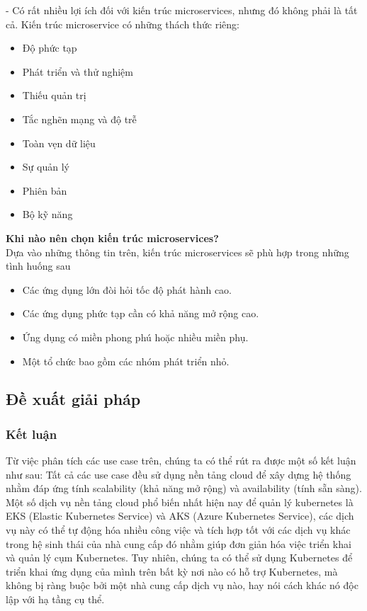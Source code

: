 \begin {list} {-}{}
Có rất nhiều lợi ích đối với kiến trúc microservices, nhưng đó không phải là tất cả. Kiến trúc microservice có những thách thức riêng:
\begin{itemize}
    \item Độ phức tạp
    \item Phát triển và thử nghiệm
    \item Thiếu quản trị
    \item Tắc nghẽn mạng và độ trễ
    \item Toàn vẹn dữ liệu
    \item Sự quản lý
    \item Phiên bản
    \item Bộ kỹ năng    
\end{itemize}
\textbf{Khi nào nên chọn kiến trúc microservices?}\\[0.5cm]
Dựa vào những thông tin trên, kiến trúc microservices sẽ phù hợp trong những tình huống sau
\begin{itemize}
    \item Các ứng dụng lớn đòi hỏi tốc độ phát hành cao.
    \item Các ứng dụng phức tạp cần có khả năng mở rộng cao.
    \item Ứng dụng có miền phong phú hoặc nhiều miền phụ.
    \item Một tổ chức bao gồm các nhóm phát triển nhỏ.    
\end{itemize}
\subsection{Đề xuất giải pháp}
\subsubsection{Kết luận}
Từ việc phân tích các use case trên, chúng ta có thể rút ra được một số kết luận như sau:
\noindent Tất cả các use case đều sử dụng nền tảng cloud để xây dựng hệ thống nhằm đáp ứng tính 
scalability (khả năng mở rộng) và availability (tính sẵn sàng). Một số dịch vụ nền tảng cloud phổ biến nhất hiện nay để quản lý kubernetes là EKS (Elastic Kubernetes Service) và AKS (Azure Kubernetes Service), các dịch vụ này có thể tự động hóa nhiều công việc và tích hợp tốt với các dịch vụ khác trong hệ sinh thái của nhà cung cấp đó nhằm giúp đơn giản hóa việc triển khai và quản lý cụm Kubernetes. Tuy nhiên, chúng ta có thể sử dụng Kubernetes để triển khai ứng dụng của mình trên bất kỳ nơi nào có hỗ trợ Kubernetes, mà không bị ràng buộc bởi một nhà cung cấp dịch vụ nào, hay nói cách khác nó độc lập với hạ tầng cụ thể. 


\end{list}
